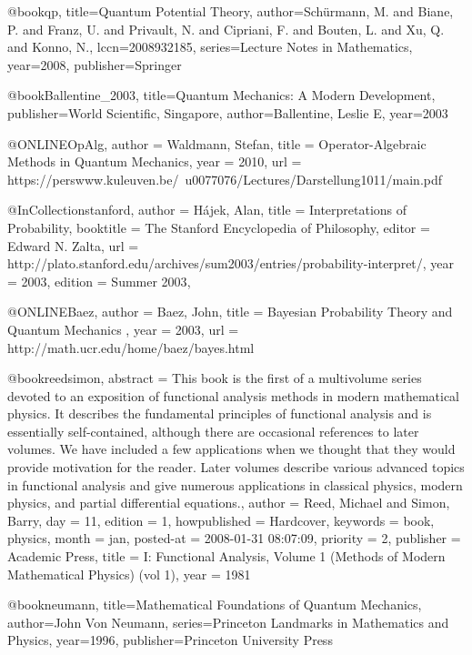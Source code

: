 @book{qp,
  title={Quantum Potential Theory},
  author={Sch{\"u}rmann, M. and Biane, P. and Franz, U. and Privault, N. and Cipriani, F. and Bouten, L. and Xu, Q. and Konno, N.},
  lccn={2008932185},
  series={Lecture Notes in Mathematics},
  year={2008},
  publisher={Springer}
}


@book{Ballentine_2003, 
title={Quantum Mechanics: A Modern Development}, 
publisher={World Scientific, Singapore}, 
author={Ballentine, Leslie E}, 
year={2003}
}

@ONLINE{OpAlg,
author = {Waldmann, Stefan},
title = {Operator-Algebraic Methods in Quantum Mechanics},
year = {2010},
url = {https://perswww.kuleuven.be/~u0077076/Lectures/Darstellung1011/main.pdf}
}

@InCollection{stanford,
	author       =	{Hájek, Alan},
	title        =	{Interpretations of Probability},
	booktitle    =	{The Stanford Encyclopedia of Philosophy},
	editor       =	{Edward N. Zalta},
	url =	{http://plato.stanford.edu/archives/sum2003/entries/probability-interpret/},
	year         =	{2003},
	edition      =	{Summer 2003},
}

@ONLINE{Baez,
author = {Baez, John},
title = {Bayesian Probability Theory and Quantum Mechanics },
year = {2003},
url = {http://math.ucr.edu/home/baez/bayes.html}
}

@book{reedsimon,
    abstract = {{This book is the first of a multivolume series devoted to an exposition of functional analysis methods in modern mathematical physics. It describes the fundamental principles of functional analysis and is essentially self-contained, although there are occasional references to later volumes. We have included a few applications when we thought that they would provide motivation for the reader. Later volumes describe various advanced topics in functional analysis and give numerous applications in classical physics, modern physics, and partial differential equations.}},
    author = {Reed, Michael and Simon, Barry},
    day = {11},
    edition = {1},
    howpublished = {Hardcover},
    keywords = {book, physics},
    month = jan,
    posted-at = {2008-01-31 08:07:09},
    priority = {2},
    publisher = {Academic Press},
    title = {{I: Functional Analysis, Volume 1 (Methods of Modern Mathematical Physics) (vol 1)}},
    year = {1981}
}

@book{neumann,
  title={Mathematical Foundations of Quantum Mechanics},
  author={John Von Neumann},
  series={Princeton Landmarks in Mathematics and Physics},
  year={1996},
  publisher={Princeton University Press}
}
